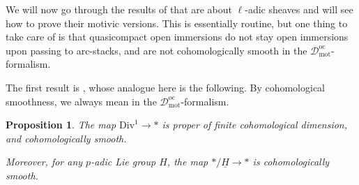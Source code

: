 \documentclass[11pt]{amsart}
\numberwithin{equation}{section}
\numberwithin{theorem}{section}
\newtheorem{proposition}[theorem]{Proposition}
\theoremstyle{definition}
\newcommand{\Div}{\mathrm{Div}}
\begin{document}
We will now go through the results of \cite{FarguesScholze} that are about $\ell$-adic sheaves and will see how to prove their motivic versions. This is essentially routine, but one thing to take care of is that quasicompact open immersions do not stay open immersions upon passing to arc-stacks, and are not cohomologically smooth in the $\mathcal D_{\mathrm{mot}}^{\mathrm{oc}}$-formalism.

The first result is \cite[Proposition II.1.21]{FarguesScholze}, whose analogue here is the following. By cohomological smoothness, we always mean in the $\mathcal D_{\mathrm{mot}}^{\mathrm{oc}}$-formalism.

\begin{proposition}\label{prop:div1propersmooth} The map $\Div^1\to \ast$ is proper of finite cohomological dimension, and cohomologically smooth.

Moreover, for any $p$-adic Lie group $H$, the map $\ast/\underline{H}\to \ast$ is cohomologically smooth.
\end{proposition}
\end{document}
